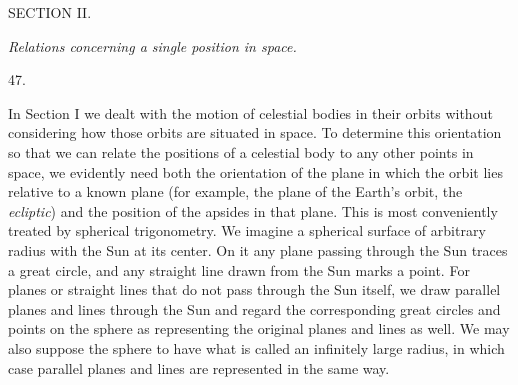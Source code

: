 \clearpage
{}
\begin{center}
{\large SECTION II.}\par\medskip
\emph{Relations concerning a single position in space.}\par\bigskip
\hypertarget{native-065-article047}{}47.
\end{center}
In Section I we dealt with the motion of celestial bodies in their orbits without considering how those orbits are situated in space. To determine this orientation so that we can relate the positions of a celestial body to any other points in space, we evidently need both the orientation of the plane in which the orbit lies relative to a known plane (for example, the plane of the Earth’s orbit, the \emph{ecliptic}) and the position of the apsides in that plane. This is most conveniently treated by spherical trigonometry. We imagine a spherical surface of arbitrary radius with the Sun at its center. On it any plane passing through the Sun traces a great circle, and any straight line drawn from the Sun marks a point. For planes or straight lines that do not pass through the Sun itself, we draw parallel planes and lines through the Sun and regard the corresponding great circles and points on the sphere as representing the original planes and lines as well. We may also suppose the sphere to have what is called an infinitely large radius, in which case parallel planes and lines are represented in the same way.

